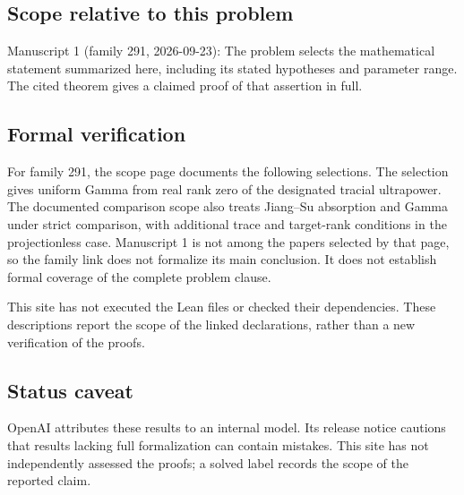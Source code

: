 \documentclass[11pt]{article}
\begin{document}
\subsection{Scope relative to this problem}
Manuscript 1 (family 291, 2026-09-23): The problem selects the mathematical statement summarized here, including its stated hypotheses and parameter range. The cited theorem gives a claimed proof of that assertion in full.

\subsection{Formal verification}
For family 291, the scope page documents the following selections. The selection gives uniform Gamma from real rank zero of the designated tracial ultrapower. The documented comparison scope also treats Jiang--Su absorption and Gamma under strict comparison, with additional trace and target-rank conditions in the projectionless case. Manuscript 1 is not among the papers selected by that page, so the family link does not formalize its main conclusion. It does not establish formal coverage of the complete problem clause.

This site has not executed the Lean files or checked their dependencies. These descriptions report the scope of the linked declarations, rather than a new verification of the proofs.

\subsection{Status caveat}
OpenAI attributes these results to an internal model. Its release notice cautions that results lacking full formalization can contain mistakes. This site has not independently assessed the proofs; a solved label records the scope of the reported claim.
\end{document}

